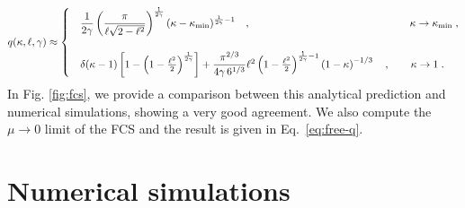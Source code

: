 \documentclass[onecolumn,superscriptaddress,
 amsmath,amssymb,
 aps,
 prd,
]{revtex4-1}
\begin{document}
{\begin{eqnarray}
q(\kappa, \ell, \gamma) \approx
\begin{cases}
& \dfrac{1}{2\gamma} \left( \dfrac{\pi}{\ell\sqrt{2 - \ell^2}} \right)^{\frac{1}{2\gamma}} (\kappa-\kappa_{\min})^{\frac{1}{2\gamma} - 1} \quad, \quad\quad\quad  \hspace*{4.3cm}\kappa \to \kappa_{\rm min} \;,\\
& \\
& \delta(\kappa - 1) \left[1 - \left(1 - \frac{\ell^2}{2}\right)^{\frac{1}{2 \gamma}}\right] + \dfrac{\pi^{2/3}}{4 \gamma \, 6^{1/3}} \ell^2 \left(1 - \frac{\ell^2}{2}\right)^{\frac{1}{2 \gamma} - 1} \left({1 - \kappa}\right)^{-1/3} \quad, \quad \quad \kappa \to  1 \;. \\
\end{cases} 
\end{eqnarray}
%
In Fig. \ref{fig:fcs}, we provide a comparison between this analytical prediction and numerical simulations, showing a very good agreement. We also compute the $\mu \to 0$ limit of the FCS and the result is given in Eq.~\eqref{eq:free-q}.


{\color{blue}
\section{Numerical simulations}

}}
\end{document}
